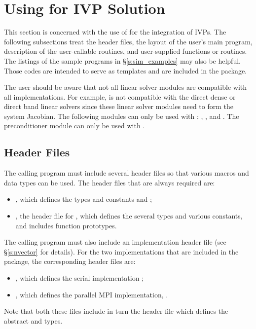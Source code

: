 \section{Using {\cvodes} for IVP Solution}\label{s:simulation}

This section is concerned with the use of {\cvodes} for the integration of IVPs.
The following subsections treat the header files, the layout of the user's main
program, description of the {\cvodes} user-callable routines, and user-supplied functions 
or routines. The listings of the sample programs in \S\ref{s:sim_examples} may also be helpful. 
Those codes are intended to serve as templates and are included in the {\cvodes} package.

The user should be aware that not all linear solver modules are compatible 
with all {\nvector} implementations. 
For example, {\nvecp} is not compatible with the direct dense or direct band 
linear solvers since these linear solver modules need to form the system Jacobian.
The following {\cvodes} modules can only be used with {\nvecs}:
{\cvdense}, {\cvband}, and {\cvbandpre}. The preconditioner module {\cvbbdpre}
can only be used with {\nvecp}. 

\subsection{Header Files}\label{ss:header_sim}

The calling program must include several header files so that various macros
and data types can be used. The header files that are always required are:
%
\begin{itemize}
\item  {}, 
  which defines the types 
  and constants  and ;
\item  {}, 
  the header file for {\cvodes}, which defines the several
  types and various constants, and includes function prototypes.
\end{itemize}
%
The calling program must also include an {\nvector} implementation header file
(see \S\ref{s:nvector} for details).
For the two {\nvector} implementations that are included in the {\cvodes} package,
the corresponding header files are:
%
\begin{itemize}
\item {}, 
  which defines the serial implementation {\nvecs};
\item {}, 
  which defines the parallel MPI implementation, {\nvecp}.
\end{itemize}
%
Note that both these files include in turn the header file  which 
defines the abstract  and  types. 

